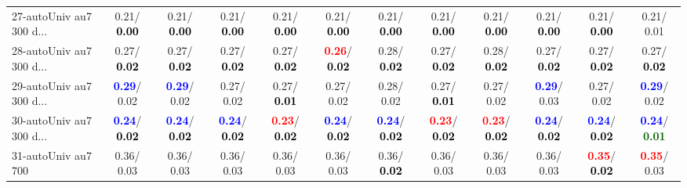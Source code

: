 \begin{table}[h]
\begin{center}
{\begin{tabular}{lc|c|c|c|c|c|c|c|c|c|c}
27-autoUniv au7 300 d... &   0.21/\textcolor{black}{\textbf{  0.00}} &   0.21/\textcolor{black}{\textbf{  0.00}} &   0.21/\textcolor{black}{\textbf{  0.00}} &   0.21/\textcolor{black}{\textbf{  0.00}} &   0.21/\textcolor{black}{\textbf{  0.00}} &   0.21/\textcolor{black}{\textbf{  0.00}} &   0.21/\textcolor{black}{\textbf{  0.00}} &   0.21/\textcolor{black}{\textbf{  0.00}} &   0.21/\textcolor{black}{\textbf{  0.00}} &   0.21/\textcolor{black}{\textbf{  0.00}} &   0.21/  0.01 \\
28-autoUniv au7 300 d... &   0.27/\textcolor{black}{\textbf{  0.02}} &   0.27/\textcolor{black}{\textbf{  0.02}} &   0.27/\textcolor{black}{\textbf{  0.02}} &   0.27/\textcolor{black}{\textbf{  0.02}} & \textcolor{red}{\textbf{  0.26}}/\textcolor{black}{\textbf{  0.02}} &   0.28/\textcolor{black}{\textbf{  0.02}} &   0.27/\textcolor{black}{\textbf{  0.02}} &   0.28/\textcolor{black}{\textbf{  0.02}} &   0.27/\textcolor{black}{\textbf{  0.02}} &   0.27/\textcolor{black}{\textbf{  0.02}} &   0.27/\textcolor{black}{\textbf{  0.02}} \\ \hline
29-autoUniv au7 300 d... & \textcolor{blue}{\textbf{  0.29}}/  0.02 & \textcolor{blue}{\textbf{  0.29}}/  0.02 &   0.27/  0.02 &   0.27/\textcolor{black}{\textbf{  0.01}} &   0.27/  0.02 &   0.28/  0.02 &   0.27/\textcolor{black}{\textbf{  0.01}} &   0.27/  0.02 & \textcolor{blue}{\textbf{  0.29}}/  0.03 &   0.27/  0.02 & \textcolor{blue}{\textbf{  0.29}}/  0.02 \\
30-autoUniv au7 300 d... & \textcolor{blue}{\textbf{  0.24}}/\textcolor{black}{\textbf{  0.02}} & \textcolor{blue}{\textbf{  0.24}}/\textcolor{black}{\textbf{  0.02}} & \textcolor{blue}{\textbf{  0.24}}/\textcolor{black}{\textbf{  0.02}} & \textcolor{red}{\textbf{  0.23}}/\textcolor{black}{\textbf{  0.02}} & \textcolor{blue}{\textbf{  0.24}}/\textcolor{black}{\textbf{  0.02}} & \textcolor{blue}{\textbf{  0.24}}/\textcolor{black}{\textbf{  0.02}} & \textcolor{red}{\textbf{  0.23}}/\textcolor{black}{\textbf{  0.02}} & \textcolor{red}{\textbf{  0.23}}/\textcolor{black}{\textbf{  0.02}} & \textcolor{blue}{\textbf{  0.24}}/\textcolor{black}{\textbf{  0.02}} & \textcolor{blue}{\textbf{  0.24}}/\textcolor{black}{\textbf{  0.02}} & \textcolor{blue}{\textbf{  0.24}}/\textcolor{darkgreen}{\textbf{  0.01}} \\
31-autoUniv au7 700 &   0.36/  0.03 &   0.36/  0.03 &   0.36/  0.03 &   0.36/  0.03 &   0.36/  0.03 &   0.36/\textcolor{black}{\textbf{  0.02}} &   0.36/  0.03 &   0.36/  0.03 &   0.36/  0.03 & \textcolor{red}{\textbf{  0.35}}/\textcolor{black}{\textbf{  0.02}} & \textcolor{red}{\textbf{  0.35}}/  0.03 \\

\end{tabular}}
\end{center}
\end{table}
